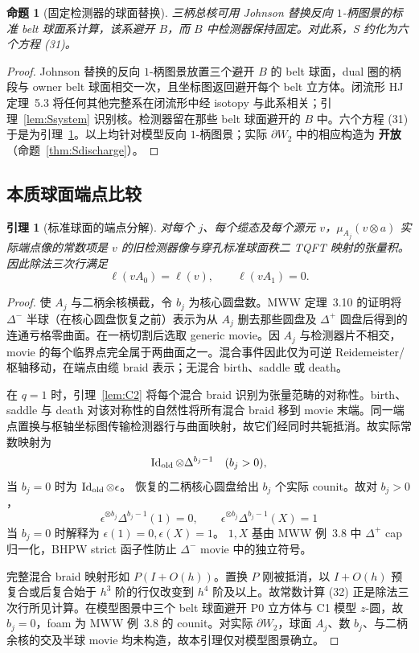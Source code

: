 \documentclass[11pt]{amsart}
\newtheorem{proposition}[theorem]{命题}
\newtheorem{lemma}[theorem]{引理}
\theoremstyle{definition}
\theoremstyle{remark}
\newcommand{\Open}{\textbf{开放}}
\begin{document}
\begin{proposition}[固定检测器的球面替换]\label{thm:Sgeometry}
三柄总核可用 Johnson 替换反向 $1$-柄图景的标准 belt 球面系计算，该系避开 $B$，而 $B$ 中检测器保持固定。对此系，S 约化为六个方程 (31)。
\end{proposition}

\begin{proof}
Johnson 替换的反向 $1$-柄图景放置三个避开 $B$ 的 belt 球面，dual 圈的柄段与 owner belt 球面相交一次，且坐标图返回避开每个 belt 立方体。闭流形 HJ 定理~5.3 将任何其他完整系在闭流形中经 isotopy 与此系相关；引理~\ref{lem:Ssystem}
识别核。检测器留在那些 belt 球面避开的 $B$ 中。六个方程 (31) 于是为引理~\ref{lem:Sendpoint}。以上均针对模型反向 $1$-柄图景；实际 $\partial W_2$ 中的相应构造为 \Open（命题~\ref{thm:Sdischarge}）。
\end{proof}

\subsection{本质球面端点比较}

\begin{lemma}[标准球面的端点分解]\label{lem:Sendpoint}
对每个 \(j\)、每个缆态及每个源元 \(v\)，\(\mu_{A_j}(v\otimes a)\) 实际端点像的常数项是 \(v\) 的旧检测器像与穿孔标准球面秩二 TQFT 映射的张量积。因此除法三次行满足
\[
\ell(vA_0)=\ell(v),\qquad \ell(vA_1)=0.
\]
\end{lemma}

\begin{proof}
使 \(A_j\) 与二柄余核横截，令 \(b_j\) 为核心圆盘数。MWW 定理~3.10 的证明将 \(\Delta^-\) 半球（在核心圆盘恢复之前）表示为从 \(A_j\) 删去那些圆盘及 \(\Delta^+\) 圆盘后得到的连通亏格零曲面。在一柄切割后选取 generic movie。因 \(A_j\) 与检测器片不相交，movie 的每个临界点完全属于两曲面之一。混合事件因此仅为可逆 Reidemeister/枢轴移动，在端点由缆 braid 表示；无混合 birth、saddle 或 death。

在 \(q=1\) 时，引理~\ref{lem:C2} 将每个混合 braid 识别为张量范畴的对称性。birth、saddle 与 death 对该对称性的自然性将所有混合 braid 移到 movie 末端。同一端点置换与枢轴坐标图传输检测器行与曲面映射，故它们经同时共轭抵消。故实际常数映射为
\[
\operatorname{Id}_{\rm old}\otimes\Delta^{b_j-1}\quad(b_j>0),
\]
当 \(b_j=0\) 时为 \(\operatorname{Id}_{\rm old}\otimes\epsilon\)。
恢复的二柄核心圆盘给出 \(b_j\) 个实际 counit。故对 \(b_j>0\)，
\[
\epsilon^{\otimes b_j}\Delta^{b_j-1}(1)=0,\qquad
\epsilon^{\otimes b_j}\Delta^{b_j-1}(X)=1
\tag{32}
\]
当 \(b_j=0\) 时解释为 \(\epsilon(1)=0,\epsilon(X)=1\)。
\(1,X\) 基由 MWW 例~3.8 中 \(\Delta^+\) cap 归一化，BHPW strict 函子性防止 \(\Delta^-\) movie 中的独立符号。

完整混合 braid 映射形如 \(P(I+O(h))\)。置换 \(P\) 刚被抵消，以 \(I+O(h)\) 预复合或后复合始于 \(h^3\) 阶的行仅改变到 \(h^4\) 阶及以上。故常数计算 (32) 正是除法三次行所见计算。在模型图景中三个 belt 球面避开 P0 立方体与 C1 模型 $z$-圆，故 $b_j=0$，foam 为 MWW 例~3.8 的 counit。对实际 $\partial W_2$，球面 $A_j$、数 $b_j$、与二柄余核的交及半球 movie 均未构造，故本引理仅对模型图景确立。
\end{proof}
\end{document}

